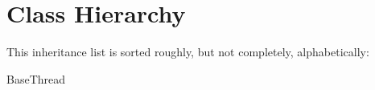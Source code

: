 \section{Class Hierarchy}
This inheritance list is sorted roughly, but not completely, alphabetically\+:\begin{DoxyCompactList}
\item Base\+Thread\begin{DoxyCompactList}
\item {}
\item {}
\end{DoxyCompactList}
\end{DoxyCompactList}
